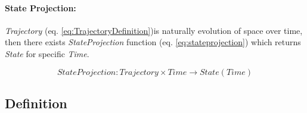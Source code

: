     \paragraph{State Projection:} \emph{Trajectory} (eq. \ref{eq:TrajectoryDefinition})is naturally evolution of space over time, then there exists \emph{StateProjection} function (eq. \ref{eq:stateprojection}) which returns \emph{State} for specific \emph{Time}.
    
    \begin{equation}\label{eq:stateprojection}
        StateProjection:Trajectory\times Time \to State(Time)
    \end{equation}

\subsection{Definition}\label{s:MovementAutomatonDefinitionAndProperties}

